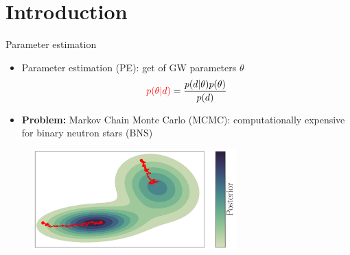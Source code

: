 \documentclass[usenames,dvipsnames,t]{beamer}
\begin{document}







\section{Introduction}

\begin{frame}{Parameter estimation}

\def\x{3mm}
\def\y{2mm}

\begin{itemize}
    \item Parameter estimation (PE): get  of GW parameters $\theta$ %
    \begin{equation*}
        \textcolor{red}{p(\theta | d)} = \frac{p(d | \theta) p(\theta)}{p(d)}
    \end{equation*}

    \vspace{\y}

    \item \textbf{Problem:} Markov Chain Monte Carlo (MCMC): computationally expensive for binary neutron stars (BNS)
    
\end{itemize}


\vspace{5mm}

\begin{figure}
  \centering
  \includegraphics[width=0.7\textwidth]{Figures/mixture_of_gaussians_projection_no_title_colorbar.pdf}
  \caption*{}
\end{figure}

\end{frame}
\end{document}
